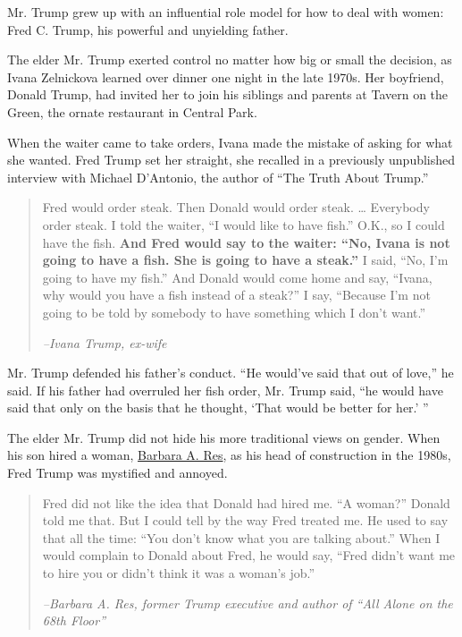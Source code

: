 Mr. Trump grew up with an influential role model for how to deal with
women: Fred C. Trump, his powerful and unyielding father.

The elder Mr. Trump exerted control no matter how big or small the
decision, as Ivana Zelnickova learned over dinner one night in the late
1970s. Her boyfriend, Donald Trump, had invited her to join his siblings
and parents at Tavern on the Green, the ornate restaurant in Central
Park.

When the waiter came to take orders, Ivana made the mistake of asking
for what she wanted. Fred Trump set her straight, she recalled in a
previously unpublished interview with Michael D'Antonio, the author of
``The Truth About Trump.''

\begin{quote}
Fred would order steak. Then Donald would order steak. \ldots{}
Everybody order steak. I told the waiter, ``I would like to have fish.''
O.K., so I could have the fish. \textbf{And Fred would say to the
waiter: ``No, Ivana is not going to have a fish. She is going to have a
steak.''} I said, ``No, I'm going to have my fish.'' And Donald would
come home and say, ``Ivana, why would you have a fish instead of a
steak?'' I say, ``Because I'm not going to be told by somebody to have
something which I don't want.''

\emph{--Ivana Trump, ex-wife}
\end{quote}

Mr. Trump defended his father's conduct. ``He would've said that out of
love,'' he said. If his father had overruled her fish order, Mr. Trump
said, ``he would have said that only on the basis that he thought, `That
would be better for her.' ''

The elder Mr. Trump did not hide his more traditional views on gender.
When his son hired a woman,
\href{https://www.createspace.com/6026691}{Barbara A. Res}, as his head
of construction in the 1980s, Fred Trump was mystified and annoyed.

\begin{quote}
Fred did not like the idea that Donald had hired me. ``A woman?'' Donald
told me that. But I could tell by the way Fred treated me. He used to
say that all the time: ``You don't know what you are talking about.''
When I would complain to Donald about Fred, he would say, ``Fred didn't
want me to hire you or didn't think it was a woman's job.''

\emph{--Barbara A. Res, former Trump executive and author of ``All Alone
on the 68th Floor''}
\end{quote}

